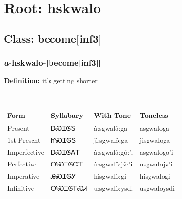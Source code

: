 \needspace{4in}
\section*{Root: hskwalo}
\nopagebreak
{}
\needspace{3in}
\subsection*{Class: become[inf3]}
\nopagebreak
\needspace{2in}
\subsubsection*{\textit{a}{-}\textbf{hskwalo}{-}[become[inf3]]}
\nopagebreak
\textbf{Definition: } it{\textquoteright}s getting shorter
\\[0.5em]
\begin{tabularx}{\textwidth}{l X X X}%
\toprule%
\textbf{Form}&\textbf{Syllabary}&\textbf{With Tone}&\textbf{Toneless}\\%
\midrule%
Present&ᎠᏍᏆᎶᎦ&à:sgwalô:ga&asgwaloga\\%
1st Present&ᏥᏍᏆᎶᎦ&jì:sgwalô:ga&jisgwaloga\\%
Imperfective&ᎠᏍᏆᎶᎪᎢ&à:sgwalô:gó:’i&asgwalogo’i\\%
Perfective&ᎤᏍᏆᎶᏨᎢ&ù:sgwalô:jv̌:’i&usgwalojv’i\\%
Imperative&ᎯᏍᏆᎶᎩ&hisgwalò:gi&hisgwalogi\\%
Infinitive&ᎤᏍᏆᎶᎢᏍᏗ&u:sgwalò:ysdi&usgwaloysdi\\%
\bottomrule%
\end{tabularx}
\\[1em]